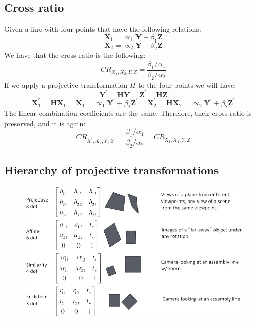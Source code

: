 \documentclass[12pt, a4paper]{report}
\begin{document}
    \subsection{Cross ratio}
    Given a line with four points that have the following relations: 
    \[\boldsymbol{X}_1=\propto_1\boldsymbol{Y}+\beta_1\boldsymbol{Z}\]
    \[\boldsymbol{X}_2=\propto_2\boldsymbol{Y}+\beta_2\boldsymbol{Z}\]
    We have that the cross ratio is the following: 
    \[CR_{X_1,X_2,Y,Z}=\dfrac{\beta_1/\alpha_1}{\beta_2/\alpha_2}\]
    If we apply a projective transformation $H$ to the four points we will have: 
    \[\boldsymbol{Y}^{'}=\boldsymbol{HY} \:\:\:\:\:\: \boldsymbol{Z}^{'}=\boldsymbol{HZ}\] 
    \[\boldsymbol{X}^{'}_1=\boldsymbol{HX}_1=\boldsymbol{X}_1=\propto_1\boldsymbol{Y}^{'}+\beta_1\boldsymbol{Z}^{'} \:\:\:\:\:\: \boldsymbol{X}^{'}_2=\boldsymbol{HX}_2=\propto_2\boldsymbol{Y}^{'}+\beta_2\boldsymbol{Z}^{'}\]
    The linear combination coefficients are the same. Therefore, their cross ratio is preserved, and it is again: 
    \[CR_{X_1^{'},X_2^{'},Y^{'},Z^{'}}=\dfrac{\beta_1/\alpha_1}{\beta_2/\alpha_2}=CR_{X_1,X_2,Y,Z}\]

    \subsection{Hierarchy of projective transformations}
    \begin{figure}[H]
        \centering
        \includegraphics[width=1\linewidth]{images/hierarchy.png}
    \end{figure}
\end{document}
